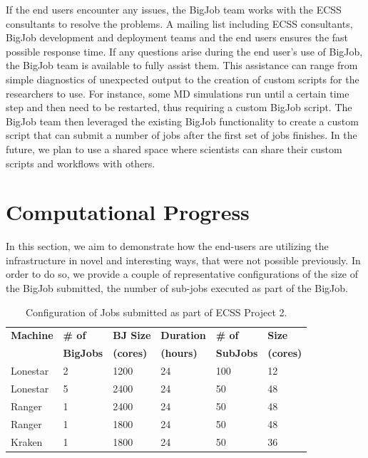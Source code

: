 \documentclass{sig-alternate}
\begin{document}
If the end users encounter any issues, the BigJob team works with the ECSS
consultants to resolve the problems. A mailing list including ECSS consultants,
BigJob development and deployment teams and the end users ensures the fast
possible response time. If any questions arise during the end user's use of
BigJob, the BigJob team is available to fully assist them. This assistance can
range from simple diagnostics of unexpected output to  the creation of
custom scripts for the researchers to use. For instance, some MD simulations
run until a certain time step and then need to be restarted, thus requiring a
custom BigJob script. The BigJob team then leveraged the existing BigJob
functionality to create a custom script that can submit a number of jobs after
the first set of jobs finishes. In the future, we plan to use a shared space
where scientists can share their custom scripts and workflows with others.

\section{Computational Progress}

In this section, we aim to demonstrate how the end-users are utilizing
the infrastructure in novel and interesting ways, that were not
possible previously. In order to do so, we provide a couple of
representative configurations of the size of the BigJob submitted, the
number of sub-jobs executed as part of the BigJob.


\begin{table}[h]
\begin{center}
\begin{tabular}{p{1.1cm}p{1.2cm}p{1.2cm}p{1.2cm}p{1.1cm}p{0.8cm}}
\toprule
\textbf{Machine}  & 
\textbf{\# of}    &
\textbf{BJ Size} & 
\textbf{Duration} & 
\textbf{\# of}    &
\textbf{Size}     \\
                 &
\textbf{BigJobs} &
\textbf{(cores)} &
\textbf{(hours)} &
\textbf{SubJobs} &
\textbf{(cores)} 
                  \\ \midrule
Lonestar & 2 & 1200 & 24 & 100 & 12 \\ \midrule
Lonestar & 5 & 2400 & 24 &  50 & 48 \\ \midrule
Ranger   & 1 & 2400 & 24 &  50 & 48 \\ \midrule
Ranger   & 1 & 1800 & 24 &  50 & 48 \\ \midrule
Kraken   & 1 & 1800 & 24 &  50 & 36 \\ \bottomrule
\end{tabular}
\caption{Configuration of Jobs submitted as part of ECSS Project
  2.}
\label{table:results1}
\end{center}
\end{table}
\end{document}
